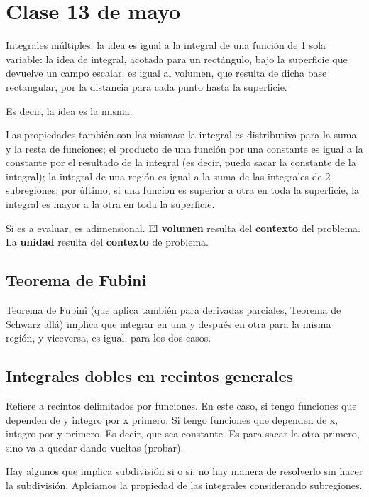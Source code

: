 \section{Clase 13 de mayo}

Integrales múltiples:
la idea es igual a la integral de una función de 1 sola variable:
la idea de integral, acotada para un rectángulo,
bajo la superficie que devuelve un campo escalar,
es igual al volumen,
que resulta de dicha base rectangular,
por la distancia para cada punto hasta la superficie.

Es decir,
la idea es la misma.

Las propiedades también son las mismas:
la integral es distributiva para la suma y la resta de funciones;
el producto de una función por una constante es igual a la constante por el resultado de la integral
(es decir, puedo sacar la constante de la integral);
la integral de una región es igual a la suma de las integrales de 2 subregiones;
por último,
si una funcíon es superior a otra en toda la superficie, 
la integral es mayor a la otra en toda la superficie.

Si es a evaluar, es adimensional.
El \textbf{volumen} resulta del \textbf{contexto} del problema.
La \textbf{unidad} resulta del \textbf{contexto} de problema.

\subsection{Teorema de Fubini}

Teorema de Fubini
(que aplica también para derivadas parciales, Teorema de Schwarz allá)
implica que integrar en una  y después en otra para la misma región,
y viceversa,
es igual,
para los dos casos.

\subsection{Integrales dobles en recintos generales}

Refiere a recintos delimitados por funciones.
En este caso, si tengo funciones que dependen de y integro por x primero.
Si tengo funciones que dependen de x, integro por y primero.
Es decir, que sea constante.
Es para sacar la otra primero,
sino va a quedar dando vueltas
(probar).

Hay algunos que implica subdivisión si o si:
no hay manera de resolverlo sin hacer la subdivisión.
Aplciamos la propiedad de las integrales considerando subregiones.

